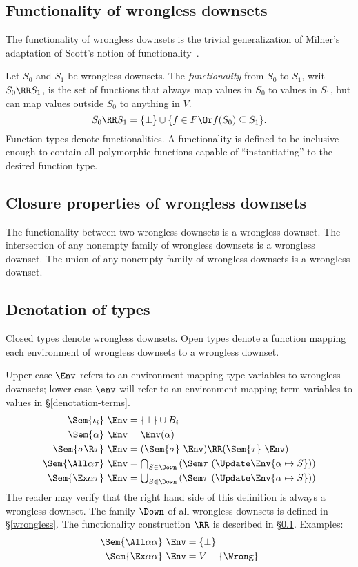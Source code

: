 \documentclass{amsart}
\theoremstyle{definition}
\begin{document}
\subsection{Functionality of wrongless downsets}
\label{functionality}
The functionality of wrongless down\-sets is the trivial
generalization of Milner's adaptation of Scott's notion of
functionality~\cite{Milner78}.

Let $S_0$ and $S_1$ be wrongless downsets. The
\emph{functionality} from $S_0$ to $S_1$, writ $S_0\RR S_1$, is
the set of functions that always map values in $S_0$ to values in
$S_1$, but can map values outside $S_0$ to anything in $V$.
\[
S_0 \RR S_1 =
\{\bot\}\cup\{f\in F \Or f(S_0) \subseteq S_1\}.
\]
Function types denote functionalities. A functionality is defined
to be inclusive enough to contain all polymorphic functions
capable of ``instantiating'' to the desired function type.

\subsection{Closure properties of wrongless downsets}
The functionality between two wrongless downsets is a wrongless
downset. The intersection of any nonempty family of wrongless
downsets is a wrongless downset. The union of any nonempty family
of wrongless downsets is a wrongless downset.

\subsection{Denotation of types}
\label{denotation-types}
Closed types denote wrongless downsets. Open types denote a
function mapping each environment of wrongless downsets to a
wrongless downset.

Upper case $\Env$ refers to an environment mapping type variables
to wrongless downsets; lower case $\env$ will refer to an environment
mapping term variables to values in \S\ref{denotation-terms}.
\begin{align*}
\Sem{\iota_i}~\Env &= \{\bot\}\cup B_i\\
\Sem{\alpha}~\Env &= \Env(\alpha)\\
\Sem{\sigma\R\tau}~\Env&=
  (\Sem{\sigma}~\Env)\RR(\Sem{\tau}~\Env)\\
\Sem{\All\alpha\tau}~\Env&=
  {\textstyle\bigcap_{S\in\Down}}
  \left(\Sem\tau~(\Update\Env{\alpha\mapsto S})\right)\\
\Sem{\Ex\alpha\tau}~\Env&=
  {\textstyle\bigcup_{S\in\Down}}
  \left(\Sem\tau~(\Update\Env{\alpha\mapsto S})\right)
\end{align*}
The reader may verify that the right hand side of this definition
is always a wrongless downset. The family $\Down$ of all
wrongless downsets is defined in \S\ref{wrongless}. The
functionality construction $\RR$ is described in
\S\ref{functionality}. Examples:
\begin{align*}
\Sem{\All\alpha\alpha}~\Env&=\{\bot\}\\
\Sem{\Ex\alpha\alpha}~\Env&=V-\{\Wrong\}
\end{align*}
\end{document}
